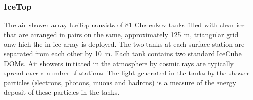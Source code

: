 \subsubsection{IceTop}

The air shower array IceTop \cite{ICECUBE:IceTop} consists of \num{81} Cherenkov tanks filled with clear ice that are arranged in pairs on the same, approximately \SI{125}{\meter}, triangular grid onw hich the in-ice array is deployed. The two tanks at each surface station are separated from each other by \SI{10}{\meter}. Each tank contains two standard IceCube DOMs. Air showers initiated in the atmosphere by cosmic rays are typically spread over a number of stations. The light generated in the tanks by the shower particles (electrons, photons, muons and hadrons) is a measure of the energy deposit of these particles in the tanks.



